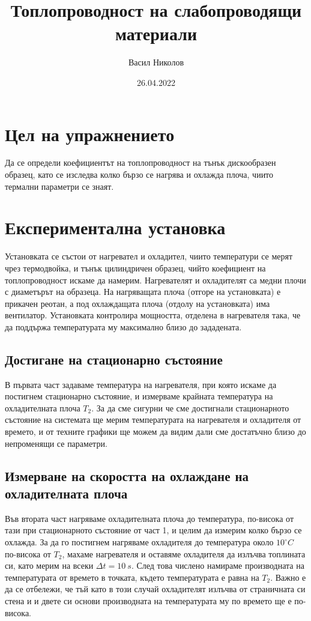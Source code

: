 \documentclass[reprint,amsmath,amssymb,aps,floatfix]{revtex4-2}
\newcommand{\degree}{^{\circ}}
\begin{document}
\title{Топлопроводност на слабопроводящи материали}

\author{Васил Николов}
\date{26.04.2022}
\maketitle


\section{Цел на упражнението}

Да се определи коефициентът на топлопроводност на тънък дискообразен образец, като се изследва колко бързо се нагрява и охлажда плоча, чиито термални параметри се знаят. 

\section{Експериментална установка}

Установката се състои от нагревател и охладител, чиито температури се мерят чрез термодвойка, и тънък цилиндричен образец, чийто коефициент на топлопроводност искаме да намерим. Нагревателят и охладителят са медни плочи с диаметърът на образеца. На нагряващата плоча (отгоре на установката) е прикачен реотан, а под охлаждащата плоча (отдолу на установката) има вентилатор. Установката контролира мощността, отделена в нагревателя така, че да поддържа температурата му максимално близо до зададената.

\subsection{Достигане на стационарно състояние}

В първата част задаваме температура на нагревателя, при която искаме да постигнем стационарно състояние, и измерваме крайната температура на охладителната плоча $T_2$. За да сме сигурни че сме достигнали стационарното състояние на системата ще мерим температурата на нагревателя и охладителя от времето, и от техните графики ще можем да видим дали сме достатъчно близо до непроменящи се параметри.

\subsection{Измерване на скоростта на охлаждане на охладителната плоча}

Във втората част нагряваме охладителната плоча до температура, по-висока от тази при стационарното състояние от част 1, и целим да измерим колко бързо се охлажда. За да го постигнем нагряваме охладителя до температура около $10 \degree C$ по-висока от $T_2$, махаме нагревателя и оставяме охладителя да излъчва топлината си, като мерим на всеки $\Delta t = 10 \ \si{s}$. След това числено намираме производната на температурата от времето в точката, където температурата е равна на $T_2$. Важно е да се отбележи, че тъй като в този случай охладителят излъчва от страничната си стена и и двете си основи производната на температурата му по времето ще е по-висока. 
\end{document}
